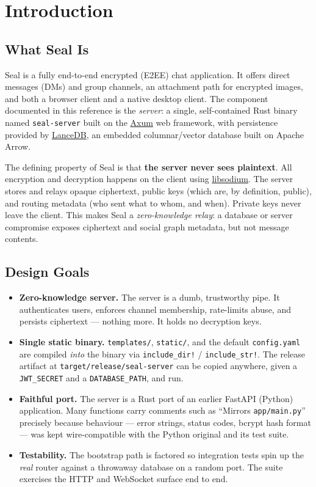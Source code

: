 \chapter{Introduction}

\section{What Seal Is}

Seal is a fully end-to-end encrypted (E2EE) chat application. It offers direct
messages (DMs) and group channels, an attachment path for encrypted images, and
both a browser client and a native desktop client. The component documented in
this reference is the \emph{server}: a single, self-contained Rust binary named
\verb|seal-server| built on the \href{https://github.com/tokio-rs/axum}{Axum} web
framework, with persistence provided by \href{https://lancedb.github.io/lancedb/}{LanceDB},
an embedded columnar/vector database built on Apache Arrow.

The defining property of Seal is that \textbf{the server never sees plaintext}.
All encryption and decryption happens on the client using
\href{https://libsodium.gitbook.io/doc/}{libsodium}. The server stores and relays
opaque ciphertext, public keys (which are, by definition, public), and routing
metadata (who sent what to whom, and when). Private keys never leave the client.
This makes Seal a \emph{zero-knowledge relay}: a database or server compromise
exposes ciphertext and social graph metadata, but not message contents.

\section{Design Goals}

\begin{itemize}
  \item \textbf{Zero-knowledge server.} The server is a dumb, trustworthy pipe.
        It authenticates users, enforces channel membership, rate-limits abuse,
        and persists ciphertext --- nothing more. It holds no decryption keys.
  \item \textbf{Single static binary.} \verb|templates/|, \verb|static/|, and the
        default \verb|config.yaml| are compiled \emph{into} the binary via
        \verb|include_dir!| / \verb|include_str!|. The release artifact at
        \verb|target/release/seal-server| can be copied anywhere, given a
        \verb|JWT_SECRET| and a \verb|DATABASE_PATH|, and run.
  \item \textbf{Faithful port.} The server is a Rust port of an earlier FastAPI
        (Python) application. Many functions carry comments such as
        ``Mirrors \texttt{app/main.py}'' precisely because behaviour --- error
        strings, status codes, bcrypt hash format --- was kept wire-compatible
        with the Python original and its test suite.
  \item \textbf{Testability.} The bootstrap path is factored so integration tests
        spin up the \emph{real} router against a throwaway database on a random
        port. The suite exercises the HTTP and WebSocket surface end to end.
\end{itemize}

